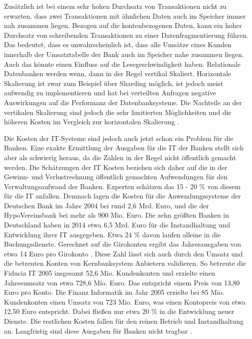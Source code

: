 \documentclass[12pt,oneside,a4paper,parskip]{scrbook}
\begin{document}
Zusätzlich ist bei einem sehr hohen Durchsatz von Transaktionen nicht zu erwarten, dass zwei Transaktionen mit ähnlichen Daten auch im Speicher immer nah zusammen liegen. Bezogen auf die kontenbezogenen Daten, kann ein hoher Durchsatz von schreibenden Transaktionen zu einer Datenfragmentierung führen. Das bedeutet, dass es unwahrscheinlich ist, dass alle Umsätze eines Kunden innerhalb der Umsatztabelle der Bank auch im Speicher nahe zusammen liegen. Auch das könnte einen Einfluss auf die Lesegeschwindigkeit haben. Relationale Datenbanken werden wenn, dann in der Regel vertikal Skaliert. Horizontale Skalierung ist zwar zum Beispiel über Sharding möglich, ist jedoch meist aufwendig zu implementieren und hat bei verteilten Anfragen negative Auswirkungen auf die Performanz der Datenbanksysteme. Die Nachteile an der vertikalen Skalierung sind jedoch die sehr limitierten Möglichkeiten und die höheren Kosten im Vergleich zur horizontalen Skalierung \cite{sharding}\cite{rdbmssuck}. 

Die Kosten der IT-Systeme sind jedoch auch jetzt schon ein Problem für die Banken. Eine exakte Ermittlung der Ausgaben für die IT der Banken stellt sich aber als schwierig heraus, da die Zahlen in der Regel nicht öffentlich gemacht werden. Die Schätzungen der IT Kosten beziehen sich daher auf die in der Gewinn- und Verlustrechnung öffentlich gemachten Aufwendungen für den Verwaltungsaufwand der Banken. Experten schätzen das 15 - 20 \% von diesem für die IT anfallen. Demnach lagen die Kosten für die Anwendungssysteme der Deutschen Bank im Jahre 2004 bei rund 2,6 Mrd. Euro, und die der HypoVereinsbank bei mehr als 900 Mio. Euro. Die zehn größten Banken in Deutschland haben in 2014 etwa 6,5 Mrd. Euro für die Instandhaltung und Entwicklung ihrer IT ausgegeben. 
Etwa 24 \% davon laufen alleine in die Buchungsdienste. Gerechnet auf die Girokonten ergibt das Jahresausgaben von etwa 14 Euro pro Girokonto \cite[29-39]{ITidF}. Diese Zahl lässt sich auch durch den Umsatz und die betreuten Konten von Kernbanksystem Anbietern validieren. So betreute die Fiducia IT 2005 insgesamt 52,6 Mio. Kundenkonten und erzielte einen Jahresumsatz von etwa 728,6 Mio. Euro. Das entspricht einem Preis von 13,80 Euro pro Konto. Die Finanz Informatik im Jahr 2005 erzielte bei 85 Mio. Kundenkonten einen Umsatz von 723 Mio. Euro, was einen Kontopreis von etwa 12,50 Euro entspricht. Dabei fließen nur etwa 20 \% in die Entwicklung neuer Dienste. Die restlichen Kosten fallen für den reinen Betrieb und Instandhaltung an. Langfristig sind diese Ausgaben für Banken nicht tragbar \cite[75-91]{ITidF}\cite{SuPdIiB}\cite[41-42]{DdF}\cite{bankingsCosts}. 
\end{document}
